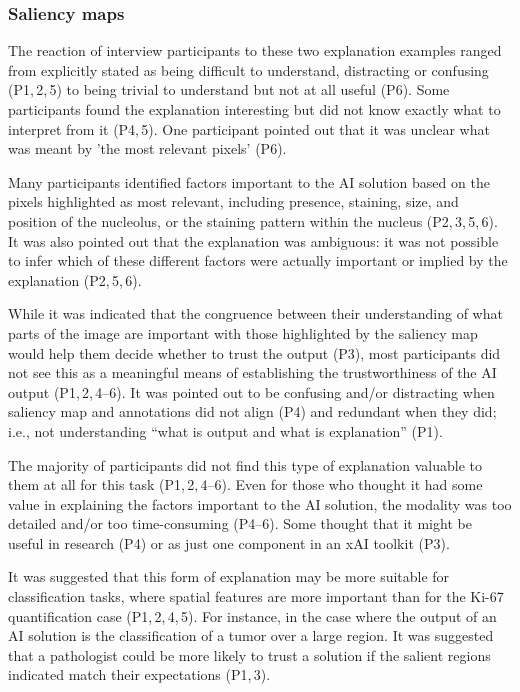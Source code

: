 \documentclass[final,5p,times,twocolumn,hyphens]{elsarticle}
\begin{document}
\subsubsection{Saliency maps}

The reaction of interview participants to these two explanation examples ranged from explicitly stated as being difficult to understand, distracting or confusing (P1,\,2,\,5) to being trivial to understand but not at all useful (P6). Some participants found the explanation interesting but did not know exactly what to interpret from it (P4,\,5). One participant pointed out that it was unclear what was meant by 'the most relevant pixels' (P6).

Many participants identified factors important to the AI solution based on the pixels highlighted as most relevant, including presence, staining, size, and position of the nucleolus, or the staining pattern within the nucleus (P2,\,3,\,5,\,6). It was also pointed out that the explanation was ambiguous: it was not possible to infer which of these different factors were actually important or implied by the explanation (P2,\,5,\,6).

While it was indicated that the congruence between their understanding of what parts of the image are important with those highlighted by the saliency map would help them decide whether to trust the output (P3), most participants did not see this as a meaningful means of establishing the trustworthiness of the AI output (P1,\,2,\,4--6). It was pointed out to be confusing and/or distracting when saliency map and annotations did not align (P4) and redundant when they did; i.e., not understanding “what is output and what is explanation” (P1). 

The majority of participants did not find this type of explanation valuable to them at all for this task (P1,\,2,\,4--6). Even for those who thought it had some value in explaining the factors important to the AI solution, the modality was too detailed and/or too time-consuming (P4--6). Some thought that it might be useful in research (P4) or as just one component in an xAI toolkit (P3).

It was suggested that this form of explanation may be more suitable for classification tasks, where spatial features are more important than for the Ki-67 quantification case (P1,\,2,\,4,\,5). For instance, in the case where the output of an AI solution is the classification of a tumor over a large region. It was suggested that a pathologist could be more likely to trust a solution if the salient regions indicated match their expectations (P1,\,3).
\end{document}
